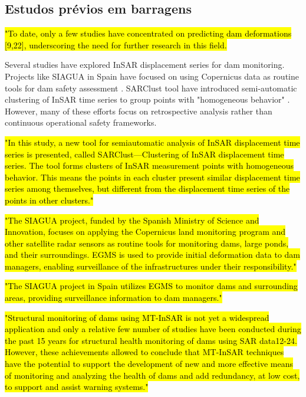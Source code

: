 \documentclass[11pt,a4paper]{article}
\begin{document}
\subsection{Estudos prévios em barragens}

\hl{\mbox{\parencite{ziemer2025}} "To date, only a few studies have concentrated on predicting dam deformations [9,22], underscoring the need for further research in this field.}

Several studies have explored InSAR displacement series for dam monitoring. Projects like SIAGUA in Spain have focused on using Copernicus data as routine tools for dam safety assessment \parencite{ruiz-armenteros2023}. SARClust tool have introduced semi-automatic clustering of InSAR time series to group points with "homogeneous behavior" \parencite{roque2023}. However, many of these efforts focus on retrospective analysis rather than continuous operational safety frameworks.

\hl{\mbox{\parencite{roque2023}} "In this study, a new tool for semiautomatic analysis of InSAR displacement time series is presented, called SARClust—Clustering of InSAR displacement time series. The tool forms clusters of InSAR measurement points with homogeneous behavior. This means the points in each cluster present similar displacement time series among themselves, but different from the displacement time series of the points in other clusters."}

\hl{\mbox{\parencite{ruiz-armenteros2023}} "The SIAGUA project, funded by the Spanish Ministry of Science and Innovation, focuses on applying the Copernicus land monitoring program and other satellite radar sensors as routine tools for monitoring dams, large ponds, and their surroundings. EGMS is used to provide initial deformation data to dam managers, enabling surveillance of the infrastructures under their responsibility."}

\hl{\mbox{\parencite{ruiz-armenteros2023}} "The SIAGUA project in Spain utilizes EGMS to monitor dams and surrounding areas, providing surveillance information to dam managers."}

\hl{\mbox{\parencite{ruiz-armenteros2018}} "Structural monitoring of dams using MT-InSAR is not yet a widespread application and only a relative few number of studies have been conducted during the past 15 years for structural health monitoring of dams using SAR data12-24. However, these achievements allowed to conclude that MT-InSAR techniques have the potential to support the development of new and more effective means of monitoring and analyzing the health of dams and add redundancy, at low cost, to support and assist warning systems."}
\end{document}
